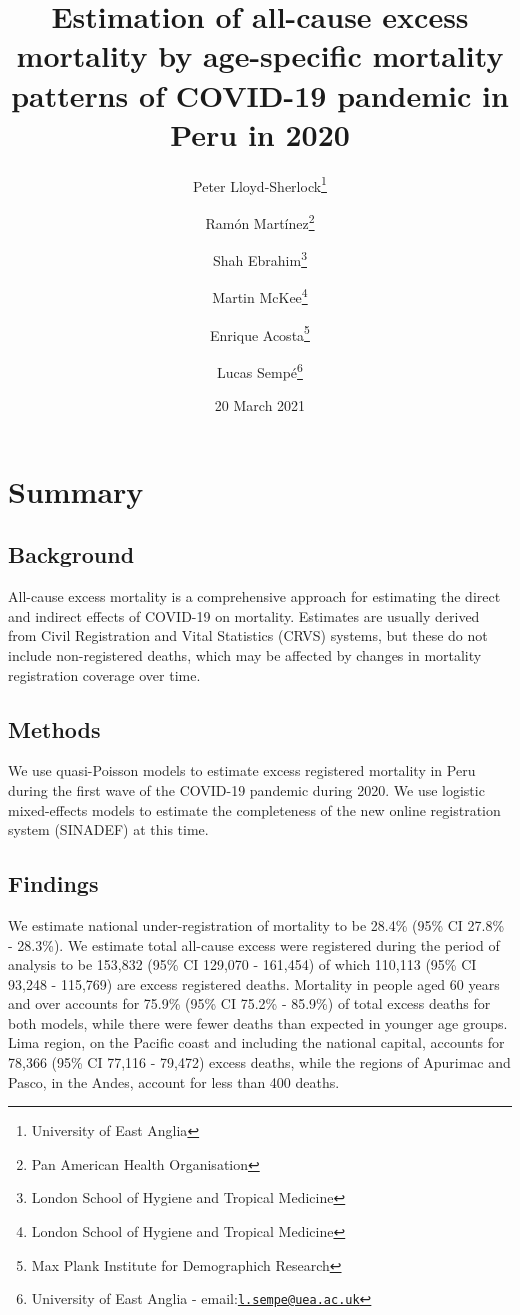 \documentclass[
]{article}
\title{Estimation of all-cause excess mortality by age-specific mortality patterns of COVID-19 pandemic in Peru in 2020}
\author{Peter Lloyd-Sherlock\footnote{University of East Anglia} \and Ramón Martínez\footnote{Pan American Health Organisation} \and Shah Ebrahim\footnote{London School of Hygiene and Tropical Medicine} \and Martin McKee\footnote{London School of Hygiene and Tropical Medicine} \and Enrique Acosta\footnote{Max Plank Institute for Demographich Research} \and Lucas Sempé\footnote{University of East Anglia - email:\href{mailto:l.sempe@uea.ac.uk}{\nolinkurl{l.sempe@uea.ac.uk}}}}
\date{20 March 2021}
\begin{document}
\maketitle

\hypertarget{summary}{%
\section*{Summary}\label{summary}}

\hypertarget{background}{%
\subsection*{Background}\label{background}}

All-cause excess mortality is a comprehensive approach for estimating the direct and indirect effects of COVID-19 on mortality. Estimates are usually derived from Civil Registration and Vital Statistics (CRVS) systems, but these do not include non-registered deaths, which may be affected by changes in mortality registration coverage over time.

\hypertarget{methods}{%
\subsection*{Methods}\label{methods}}

We use quasi-Poisson models to estimate excess registered mortality in Peru during the first wave of the COVID-19 pandemic during 2020. We use logistic mixed-effects models to estimate the completeness of the new online registration system (SINADEF) at this time.

\hypertarget{findings}{%
\subsection*{Findings}\label{findings}}

We estimate national under-registration of mortality to be 28.4\% (95\% CI 27.8\% - 28.3\%). We estimate total all-cause excess were registered during the period of analysis to be 153,832 (95\% CI 129,070 - 161,454) of which 110,113 (95\% CI 93,248 - 115,769) are excess registered deaths. Mortality in people aged 60 years and over accounts for 75.9\% (95\% CI 75.2\% - 85.9\%) of total excess deaths for both models, while there were fewer deaths than expected in younger age groups. Lima region, on the Pacific coast and including the national capital, accounts for 78,366 (95\% CI 77,116 - 79,472) excess deaths, while the regions of Apurimac and Pasco, in the Andes, account for less than 400 deaths.
\end{document}
